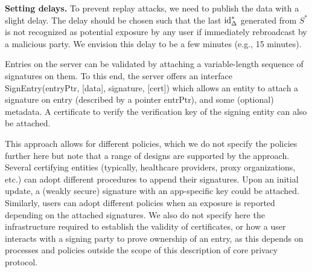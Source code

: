 \documentclass{article}
\begin{document}
{\bf Setting delays.} To prevent replay attacks, we need to publish the data with a slight delay. The delay should be chosen such that the last $\mathrm{id}^*_{\Delta}$ generated from $S^*$ is not recognized as potential exposure by any user if immediately rebroadcast by a malicious party. We envision this delay to be a few minutes (e.g., 15 minutes).


 Entries on the server can be validated by attaching a variable-length sequence of signatures on them. To this end, the server offers an interface SignEntry(entryPtr, [data], signature, [cert]) which allows an entity to attach a signature on entry (described by a pointer entrPtr), and some (optional) metadata. A certificate to verify the verification key of the signing entity can also be attached.

This approach allows for different policies, which we do not specify the policies further here but note that a range of designs are supported by the approach. Several certifying entities (typically, healthcare providers, proxy organizations, etc.) can adopt different procedures to append their signatures. Upon an initial update, a (weakly secure) signature with an app-specific key could be attached. Similarly, users can adopt different policies when an exposure is reported depending on the attached signatures. We also do not specify here the infrastructure required to establish the validity of certificates, or how a user interacts with a signing party to prove ownership of an entry, as this depends on processes and policies outside the scope of this description of core privacy protocol.
\end{document}
